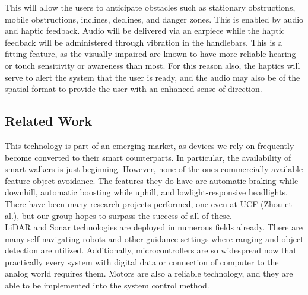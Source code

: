 \noindent This will allow the users to anticipate obstacles such as stationary obstructions, mobile obstructions, inclines, declines, and danger zones. This is enabled by audio and haptic feedback. Audio will be delivered via an earpiece while the haptic feedback will be administered through vibration in the handlebars. This is a fitting feature, as the visually impaired are known to have more reliable hearing or touch sensitivity or awareness than most. For this reason also, the haptics will serve to alert the system that the user is ready, and the audio may also be of the spatial format to provide the user with an enhanced sense of direction.


\subsection{Related Work}
\indent This technology is part of an emerging market, as devices we rely on frequently become converted to their smart counterparts. In particular, the availability of smart walkers is just beginning. However, none of the ones commercially available feature object avoidance. The features they do have are automatic braking while downhill, automatic boosting while uphill, and lowlight-responsive headlights. There have been many research projects performed, one even at UCF (Zhou et al.), but our group hopes to surpass the success of all of these.
\\

\noindent LiDAR and Sonar technologies are deployed in numerous fields already. There are many self-navigating robots and other guidance settings where ranging and object detection are utilized. Additionally, microcontrollers are so widespread now that practically every system with digital data or connection of computer to the analog world requires them. Motors are also a reliable technology, and they are able to be implemented into the system control method.


